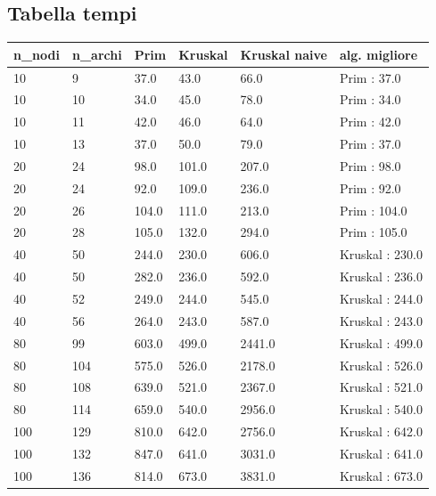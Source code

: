 \subsection{Tabella tempi}
\label{tabella\_tempi}

\renewcommand{\arraystretch}{2}
\begin{longtable}[H]{|p{1.5cm}|p{1.5cm}|p{2cm}|p{2cm}|p{3cm}|p{3cm}|} \hline
    \rowcolor{lightgray}
    \textbf{n\_nodi} & \textbf{n\_archi} & \textbf{Prim} & \textbf{Kruskal} & \textbf{Kruskal naive} & \textbf{alg. migliore}\\ \hline\hline
    \endhead
    10 & 9 & 37.0 & 43.0 & 66.0 & Prim : 37.0 \\ \hline
    10 & 10 & 34.0 & 45.0 & 78.0 & Prim : 34.0 \\ \hline
    10 & 11 & 42.0 & 46.0 & 64.0 & Prim : 42.0 \\ \hline
    10 & 13 & 37.0 & 50.0 & 79.0 & Prim : 37.0 \\ \hline
    20 & 24 & 98.0 & 101.0 & 207.0 & Prim : 98.0 \\ \hline
    20 & 24 & 92.0 & 109.0 & 236.0 & Prim : 92.0 \\ \hline
    20 & 26 & 104.0 & 111.0 & 213.0 & Prim : 104.0 \\ \hline
    20 & 28 & 105.0 & 132.0 & 294.0 & Prim : 105.0 \\ \hline
    40 & 50 & 244.0 & 230.0 & 606.0 & Kruskal : 230.0 \\ \hline
    40 & 50 & 282.0 & 236.0 & 592.0 & Kruskal : 236.0 \\ \hline
    40 & 52 & 249.0 & 244.0 & 545.0 & Kruskal : 244.0 \\ \hline
    40 & 56 & 264.0 & 243.0 & 587.0 & Kruskal : 243.0 \\ \hline
    80 & 99 & 603.0 & 499.0 & 2441.0 & Kruskal : 499.0 \\ \hline
    80 & 104 & 575.0 & 526.0 & 2178.0 & Kruskal : 526.0 \\ \hline
    80 & 108 & 639.0 & 521.0 & 2367.0 & Kruskal : 521.0 \\ \hline
    80 & 114 & 659.0 & 540.0 & 2956.0 & Kruskal : 540.0 \\ \hline
    100 & 129 & 810.0 & 642.0 & 2756.0 & Kruskal : 642.0 \\ \hline
    100 & 132 & 847.0 & 641.0 & 3031.0 & Kruskal : 641.0 \\ \hline
    100 & 136 & 814.0 & 673.0 & 3831.0 & Kruskal : 673.0 \\ \hline

\end{longtable}
